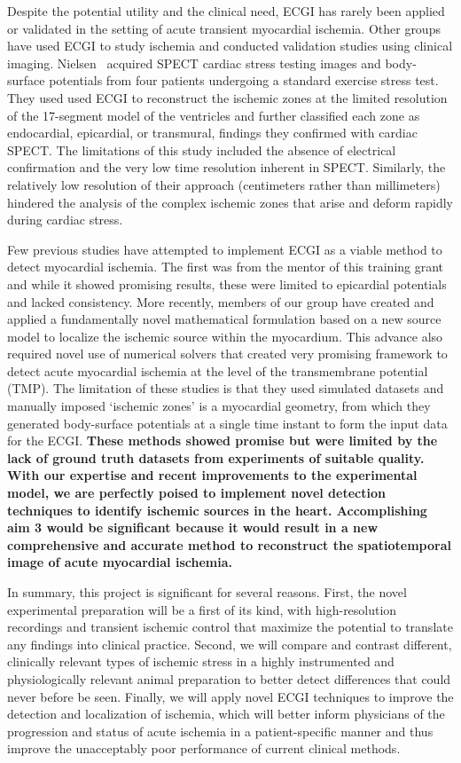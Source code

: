 Despite the potential utility and the clinical need, ECGI has rarely been applied or validated in the setting of acute transient myocardial ischemia. Other groups have used ECGI to study ischemia and conducted validation studies using clinical imaging. Nielsen \etal~acquired SPECT cardiac stress testing images and body-surface potentials from four patients undergoing a standard exercise stress test.\cite{BMB:Nie2013} They used used ECGI to reconstruct the ischemic zones at the limited resolution of the 17-segment model of the ventricles and further classified each zone as endocardial, epicardial, or transmural, findings they confirmed with cardiac SPECT. The limitations of this study included the absence of electrical confirmation and the very low time resolution inherent in SPECT. Similarly, the relatively low resolution of their approach (centimeters rather than millimeters) hindered the analysis of the complex ischemic zones that arise and deform rapidly during cardiac stress.

 Few previous studies have attempted to implement ECGI as a viable method to detect myocardial ischemia. The first was from the mentor of this training grant \cite{RSM:Mac95} and while it showed promising results, these were limited to epicardial potentials and lacked consistency.  More recently, members of our group have created and applied a fundamentally novel mathematical formulation based on a new source model to localize the ischemic source within the myocardium. This advance also required novel use of numerical solvers that created very promising framework to detect acute myocardial ischemia at the level of the transmembrane potential (TMP).\cite{RSM:Wan2013,RSM:Wan2011a} The limitation of these studies is that they used simulated datasets and manually imposed `ischemic zones' is a myocardial geometry, from which they generated body-surface potentials at a single time instant to form the input data for the ECGI. \textbf{These methods showed promise but were limited by the lack of ground truth datasets from experiments of suitable quality. With our expertise and recent improvements to the experimental model, we are perfectly poised to implement novel detection techniques to identify ischemic sources in the heart. Accomplishing aim 3 would be significant because it would result in a new comprehensive and accurate method to reconstruct the spatiotemporal image of acute myocardial ischemia.}

In summary, this project is significant for several reasons. First, the novel experimental preparation will be a first of its kind, with high-resolution recordings and transient ischemic control that maximize the potential to translate any findings into clinical practice. Second, we will compare and contrast different, clinically relevant types of ischemic stress in a highly instrumented and physiologically relevant animal preparation to better detect differences that could never before be seen. Finally, we will apply novel ECGI techniques to improve the detection and localization of ischemia, which will better inform physicians of the progression and status of acute ischemia in a patient-specific manner and thus improve the unacceptably poor performance of current clinical methods.

